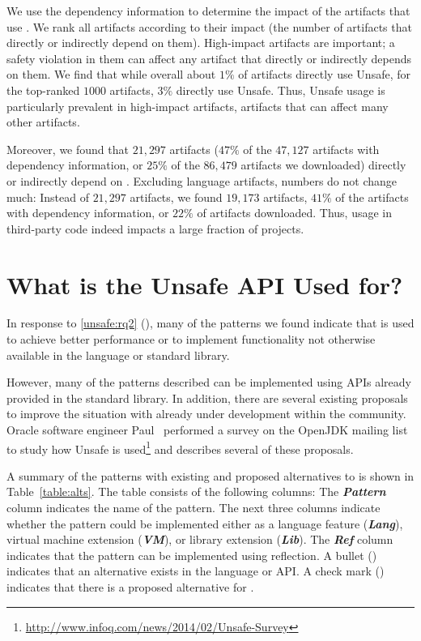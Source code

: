 We use the dependency information to determine the impact of the artifacts that use .
We rank all artifacts according to their impact (the number of artifacts that directly or indirectly depend on them).
High-impact artifacts are important;
a safety violation in them can affect any artifact that directly or indirectly depends on them.
We find that while overall about $1\%$ of artifacts directly use Unsafe,
for the top-ranked $1000$ artifacts, $3\%$ directly use Unsafe.
Thus, Unsafe usage is particularly prevalent in high-impact artifacts, artifacts that can affect many other artifacts.

Moreover, we found that $21,297$ artifacts ($47\%$ of the $47,127$ artifacts with dependency information, or $25\%$ of the $86,479$ artifacts we downloaded) directly or indirectly depend on .
Excluding language artifacts, numbers do not change much:
Instead of $21,297$ artifacts, we found $19,173$ artifacts,
$41\%$ of the artifacts with dependency information, or $22\%$ of artifacts downloaded.
Thus,  usage in third-party code indeed impacts a large fraction of projects.






\section{What is the Unsafe API Used for?}
\label{sec:unsafe:discussion}

In response to \ref{unsafe:rq2} (\emph{\urqB}),
many of the patterns we found indicate that \unsafe{} is used to achieve 
better performance or to implement functionality not otherwise available in the \java{} language or standard library.

However, many of the patterns described can be implemented using APIs
already provided in the \java{} standard library. 
In addition, there are several existing proposals to improve the situation
with \unsafe{} already under development within the \java{} community.
Oracle software engineer Paul~\cite{psandoz14} performed a survey on
the OpenJDK mailing list to
study how Unsafe is
used\footnote{\url{http://www.infoq.com/news/2014/02/Unsafe-Survey}} and
describes several of these proposals.



A summary of the patterns with existing and proposed alternatives to \unsafe{} is shown in Table~\ref{table:alts}.
The table consists of the following columns:
The \textbf{\em Pattern} column indicates the name of the pattern.
The next three columns indicate whether the pattern could be implemented either as a
language feature (\textbf{\em Lang}),
virtual machine extension (\textbf{\em VM}),
or
library extension (\textbf{\em Lib}).
The \textbf{\em Ref} column indicates that the pattern can be
implemented using reflection.
A bullet (\exis) indicates that an
alternative exists in the \java{} language or API. A check mark (\tick)
indicates that there is a proposed alternative for \java{}.

